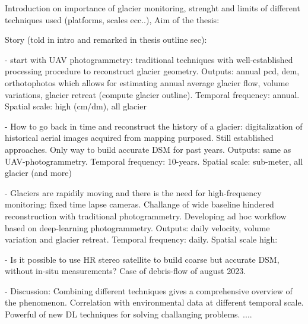 \documentclass[12pt]{article}
\begin{document}
Introduction on importance of glacier monitoring, strenght and limits of different techniques used (platforms, scales ecc..), 
Aim of the thesis: 

Story (told in intro and remarked in thesis outline sec): 

- start with UAV photogrammetry: traditional techniques with well-established processing procedure to reconstruct glacier geometry. 
Outputs: annual pcd, dem, orthotophotos which allows for estimating annual average glacier flow, volume variations, glacier retreat (compute glacier outline). 
Temporal frequency: annual. Spatial scale: high (cm/dm), all glacier

- How to go back in time and reconstruct the history of a glacier: digitalization of historical aerial images acquired from mapping purposed. Still established approaches. 
Only way to build accurate DSM for past years.
Outputs: same as UAV-photogrammetry. Temporal frequency: 10-years. Spatial scale: sub-meter, all glacier (and more)

- Glaciers are rapidily moving and there is the need for high-frequency monitoring: fixed time lapse cameras. Challange of wide baseline hindered reconstruction with traditional photogrammetry. Developing ad hoc workflow based on deep-learning photogrammetry.
Outputs: daily velocity, volume variation and glacier retreat. Temporal frequency: daily. Spatial scale high: 

- Is it possible to use HR stereo satellite to build coarse but accurate DSM, without in-situ measurements?
Case of debris-flow of august 2023.

- Discussion: 
Combining different techniques gives a comprehensive overview of the phenomenon.
Correlation with environmental data at different temporal scale.
Powerful of new DL techniques for solving challanging problems.
....
\end{document}
